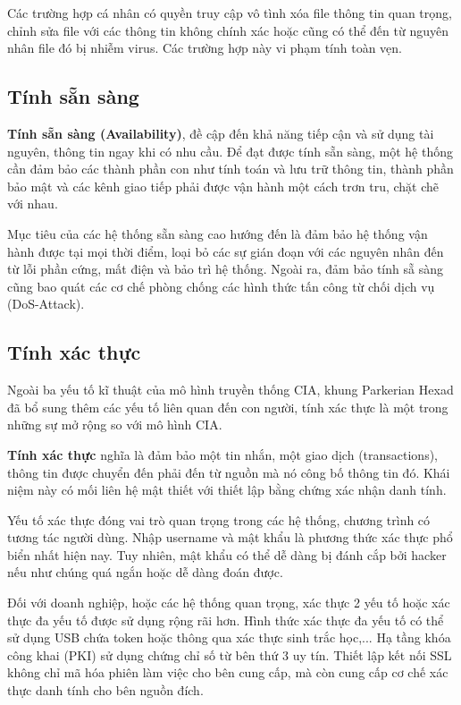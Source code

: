 Các trường hợp cá nhân có quyền truy cập vô tình xóa file thông tin quan trọng, chỉnh sửa file với các thông tin không chính xác hoặc cũng có thể đến từ nguyên nhân file đó bị nhiễm virus. Các trường hợp này vi phạm tính toàn vẹn. \nocite{pender-bey_2012}

\subsection{Tính sẵn sàng}
\textbf{Tính sẵn sàng (Availability)}, đề cập đến khả năng tiếp cận và sử dụng tài nguyên, thông tin ngay khi có nhu cầu. Để đạt được tính sẵn sàng, một hệ thống cần đảm bảo các thành phần con như tính toán và lưu trữ thông tin, thành phần bảo mật và các kênh giao tiếp phải được vận hành một cách trơn tru, chặt chẽ với nhau. 

Mục tiêu của các hệ thống sẵn sàng cao hướng đến là đảm bảo hệ thống vận hành được tại mọi thời điểm, loại bỏ các sự gián đoạn với các nguyên nhân đến từ lỗi phần cứng, mất điện và bảo trì hệ thống. Ngoài ra, đảm bảo tính sẵ sàng cũng bao quát các cơ chế phòng chống các hình thức tấn công từ chối dịch vụ (DoS-Attack). \nocite{hon_keung_2013}

\subsection{Tính xác thực}

Ngoài ba yếu tố kĩ thuật của mô hình truyền thống CIA, khung Parkerian Hexad đã bổ sung thêm các yếu tố liên quan đến con người, tính xác thực là một trong những sự mở rộng so với mô hình CIA.

\textbf{Tính xác thực} nghĩa là đảm bảo một tin nhắn, một giao dịch (transactions), thông tin được chuyển đến phải đến từ nguồn mà nó công bố thông tin đó. Khái niệm này có mối liên hệ mật thiết với thiết lập bằng chứng xác nhận danh tính. \nocite{lee_2009}
	
Yếu tố xác thực đóng vai trò quan trọng trong các hệ thống, chương trình có tương tác người dùng. Nhập username và mật khẩu là phương thức xác thực phổ biển nhất hiện nay. Tuy nhiên, mật khẩu có thể dễ dàng bị đánh cắp bởi hacker nếu như chúng quá ngắn hoặc dễ dàng đoán được.

Đối với doanh nghiệp, hoặc các hệ thống quan trọng, xác thực 2 yếu tố hoặc xác thực đa yếu tố được sử dụng rộng rãi hơn. Hình thức xác thực đa yếu tố có thể sử dụng USB chứa token hoặc thông qua xác thực sinh trắc học,... Hạ tầng khóa công khai (PKI) sử dụng chứng chỉ số từ bên thứ 3 uy tín. Thiết lập kết nối SSL không chỉ mã hóa phiên làm việc cho bên cung cấp, mà còn cung cấp cơ chế xác thực danh tính cho bên nguồn đích. \nocite{lee_2009}

